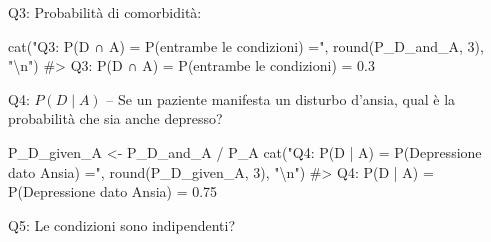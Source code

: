 \documentclass[
  letterpaper,
  DIV=11,
  numbers=noendperiod,
  oneside]{scrreprt}
\newenvironment{Shaded}{\begin{snugshade}}{\end{snugshade}}
\newcommand{\CommentTok}[1]{\textcolor[rgb]{0.37,0.37,0.37}{#1}}
\newcommand{\DecValTok}[1]{\textcolor[rgb]{0.68,0.00,0.00}{#1}}
\newcommand{\FunctionTok}[1]{\textcolor[rgb]{0.28,0.35,0.67}{#1}}
\newcommand{\NormalTok}[1]{\textcolor[rgb]{0.00,0.23,0.31}{#1}}
\newcommand{\OtherTok}[1]{\textcolor[rgb]{0.00,0.23,0.31}{#1}}
\newcommand{\SpecialCharTok}[1]{\textcolor[rgb]{0.37,0.37,0.37}{#1}}
\newcommand{\StringTok}[1]{\textcolor[rgb]{0.13,0.47,0.30}{#1}}
\theoremstyle{definition}
\theoremstyle{plain}
\theoremstyle{definition}
\theoremstyle{remark}
\begin{document}
Q3: Probabilità di comorbidità:

\begin{Shaded}
\begin{Highlighting}[]
\FunctionTok{cat}\NormalTok{(}\StringTok{"Q3: P(D ∩ A) = P(entrambe le condizioni) ="}\NormalTok{, }\FunctionTok{round}\NormalTok{(P\_D\_and\_A, }\DecValTok{3}\NormalTok{), }\StringTok{"}\SpecialCharTok{\textbackslash{}n}\StringTok{"}\NormalTok{)}
\CommentTok{\#\textgreater{} Q3: P(D ∩ A) = P(entrambe le condizioni) = 0.3}
\end{Highlighting}
\end{Shaded}

Q4: \(P(D \mid A)\) -- Se un paziente manifesta un disturbo d'ansia,
qual è la probabilità che sia anche depresso?

\begin{Shaded}
\begin{Highlighting}[]
\NormalTok{P\_D\_given\_A }\OtherTok{\textless{}{-}}\NormalTok{ P\_D\_and\_A }\SpecialCharTok{/}\NormalTok{ P\_A}
\FunctionTok{cat}\NormalTok{(}\StringTok{"Q4: P(D | A) = P(Depressione dato Ansia) ="}\NormalTok{, }\FunctionTok{round}\NormalTok{(P\_D\_given\_A, }\DecValTok{3}\NormalTok{), }\StringTok{"}\SpecialCharTok{\textbackslash{}n}\StringTok{"}\NormalTok{)}
\CommentTok{\#\textgreater{} Q4: P(D | A) = P(Depressione dato Ansia) = 0.75}
\end{Highlighting}
\end{Shaded}

Q5: Le condizioni sono indipendenti?
\end{document}
